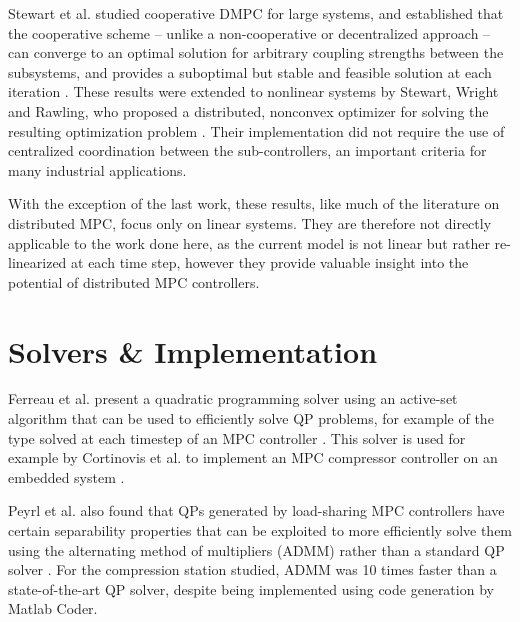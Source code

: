 Stewart et al. studied cooperative DMPC for large systems, and established that the cooperative scheme -- unlike a non-cooperative or decentralized approach -- can converge to an optimal solution for arbitrary coupling strengths between the subsystems, and provides a suboptimal but stable and feasible solution at each iteration \cite{Stewart2010}.
These results were extended to nonlinear systems by Stewart, Wright and Rawling, who proposed a distributed, nonconvex optimizer for solving the resulting optimization problem \cite{Stewart2011}.
Their implementation did not require the use of centralized coordination between the sub-controllers, an important criteria for many industrial applications.

With the exception of the last work, these results, like much of the literature on distributed MPC, focus only on linear systems. 
They are therefore not directly applicable to the work done here, as the current model is not linear but rather re-linearized at each time step, however they provide valuable insight into the potential of distributed MPC controllers.


\section{Solvers \& Implementation}

Ferreau et al. present a quadratic programming solver using an active-set algorithm that can be used to efficiently solve QP problems, for example of the type solved at each timestep of an MPC controller \cite{Ferreau2014}. 
This solver is used for example by Cortinovis et al. to implement an MPC compressor controller on an embedded system \cite{Cortinovis2015}. 

Peyrl et al. also found that QPs generated by load-sharing MPC controllers have certain separability properties that can be exploited to more efficiently solve them using the alternating method of multipliers (ADMM) rather than a standard QP solver \cite{Peyrl2015}. For the compression station studied, ADMM was 10 times faster than a state-of-the-art QP solver, despite being implemented using code generation by Matlab Coder.







